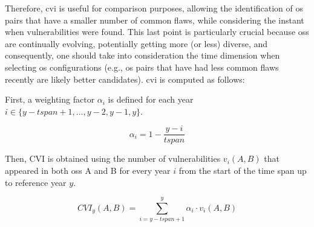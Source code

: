 Therefore, \gls{cvi} is useful for comparison purposes, allowing the identification of \gls{os} pairs that have a smaller number of common flaws, while considering the instant when vulnerabilities were found. 
This last point is particularly crucial because \glspl{os} are continually evolving, potentially getting more (or less) diverse, and consequently, one should take into consideration the time dimension when selecting \gls{os} configurations (e.g., \gls{os} pairs that have had less common flaws recently are likely better candidates).
\gls{cvi} is computed as follows:

First, a weighting factor $\alpha_{i}$ is defined for each year   $i \in \{y-\mathit{tspan}+1, ..., y-2, y-1, y\}$.

\begin{equation}
\alpha_{i} = 1 - \frac{y-i}{\mathit{tspan}}
\end{equation}

Then, CVI is obtained using the number of vulnerabilities $v_{i}(A,B)$ that appeared in both \glspl{os} A and B for every year $i$ from the start of the time span up to reference year $y$.

\begin{equation}
\mathit{CVI}_{y}(A,B)= \sum_{i = y-\mathit{tspan}+1}^{y} \alpha_{i}\cdot v_{i}(A,B)
\end{equation}


